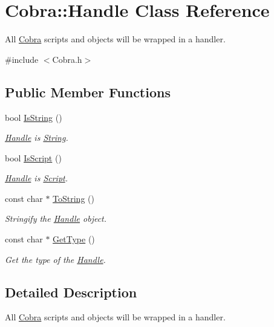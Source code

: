 \hypertarget{class_cobra_1_1_handle}{\section{Cobra\+:\+:Handle Class Reference}
\label{class_cobra_1_1_handle}
}


All \hyperlink{namespace_cobra}{Cobra} scripts and objects will be wrapped in a handler.  




{\ttfamily \#include $<$Cobra.\+h$>$}

\subsection*{Public Member Functions}
\begin{DoxyCompactItemize}
\item 
bool \hyperlink{class_cobra_1_1_handle_a1cd39727327efaaea04597acae87eca7}{Is\+String} ()
\begin{DoxyCompactList}\small\item\em \hyperlink{class_cobra_1_1_handle}{Handle} is \hyperlink{class_cobra_1_1_string}{String}. \end{DoxyCompactList}\item 
bool \hyperlink{class_cobra_1_1_handle_a4e641103844a622cec39b8e53f056112}{Is\+Script} ()
\begin{DoxyCompactList}\small\item\em \hyperlink{class_cobra_1_1_handle}{Handle} is \hyperlink{class_cobra_1_1_script}{Script}. \end{DoxyCompactList}\item 
const char $\ast$ \hyperlink{class_cobra_1_1_handle_a1cc4baae13a1fbf6d5d101b5fc5b11d5}{To\+String} ()
\begin{DoxyCompactList}\small\item\em Stringify the \hyperlink{class_cobra_1_1_handle}{Handle} object. \end{DoxyCompactList}\item 
const char $\ast$ \hyperlink{class_cobra_1_1_handle_a638691042734265cab9b15668fd72fc8}{Get\+Type} ()
\begin{DoxyCompactList}\small\item\em Get the type of the \hyperlink{class_cobra_1_1_handle}{Handle}. \end{DoxyCompactList}\end{DoxyCompactItemize}


\subsection{Detailed Description}
All \hyperlink{namespace_cobra}{Cobra} scripts and objects will be wrapped in a handler. 

